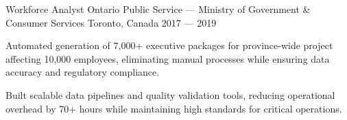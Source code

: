 \begin{cventries}
\cventry%
	{Workforce Analyst}
	{Ontario Public Service --- Ministry of Government \& Consumer Services}
	{Toronto, Canada}
	{2017 --- 2019}
	{
		\begin{cvitems}
			\item Automated generation of 7,000+ executive packages for province-wide project affecting 10,000 employees, eliminating manual processes while ensuring data accuracy and regulatory compliance.
			\item Built scalable data pipelines and quality validation tools, reducing operational overhead by 70+ hours while maintaining high standards for critical operations.
		\end{cvitems}
	}

\end{cventries}